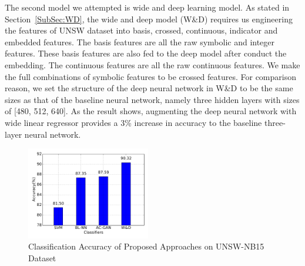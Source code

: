 The second model we attempted is wide and deep learning model.
As stated in Section~\ref{SubSec:WD}, the wide and deep model (W\&D) requires us engineering the features of UNSW dataset into
basis, crossed, continuous, indicator and embedded features.
The basis features are all the raw symbolic and integer features.
These basis features are also fed to the deep model after conduct the embedding.
The continuous features are all the raw continuous features.
We make the full combinations of symbolic features to be crossed features.
For comparison reason, we set the structure of the deep neural network in W\&D to be the same sizes as
that of the baseline neural network, namely three hidden layers with sizes of [480, 512, 640].
As the result shows, augmenting the deep neural network with wide linear regressor
provides a 3\% increase in accuracy to the baseline three-layer neural network.

\begin{figure}[h]
    \centering
    \includegraphics[width=0.48\textwidth]{figures/comp_accuracy_unsw.pdf}
    \caption{Classification Accuracy of Proposed Approaches on UNSW-NB15 Dataset}
    \label{Fig:CompAccuracyUNSW}
\end{figure}

